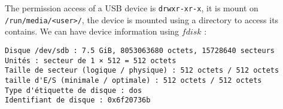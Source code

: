 \documentclass[a4paper,11pt]{report}
\begin{document}
The permission access of a USB device is \verb+drwxr-xr-x+, it is mount on
\verb+/run/media/<user>/+, the device is mounted using a directory to access its
contains. We can have device information using $fdisk$ :

\begin{verbatim}
Disque /dev/sdb : 7.5 GiB, 8053063680 octets, 15728640 secteurs
Unités : secteur de 1 × 512 = 512 octets
Taille de secteur (logique / physique) : 512 octets / 512 octets
taille d'E/S (minimale / optimale) : 512 octets / 512 octets
Type d'étiquette de disque : dos
Identifiant de disque : 0x6f20736b
\end{verbatim}
\end{document}

